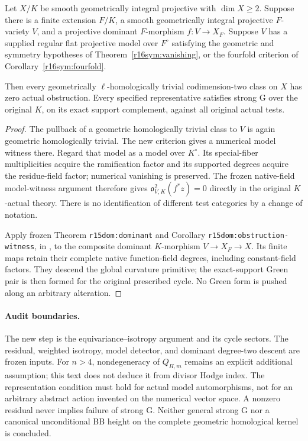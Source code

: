 \begin{corollary}
\label{r16sym:dominant}
Let $X/K$ be smooth geometrically integral projective with $\dim X\geq2$.
Suppose there is a finite extension $F/K$, a smooth geometrically integral
projective $F$-variety $V$, and a projective dominant
$F$-morphism $f:V\to X_F$.  Suppose $V$ has a supplied
regular flat projective model over $F^\circ$ satisfying the
geometric and symmetry hypotheses of
Theorem~\ref{r16sym:vanishing}, or the fourfold criterion
of Corollary~\ref{r16sym:fourfold}.

Then every geometrically $\ell$-homologically trivial
codimension-two class on $X$ has zero actual obstruction.
Every specified representative satisfies strong G over
the original $K$, on its exact support complement, against
all original actual tests.
\end{corollary}

\begin{proof}
The pullback of a geometric homologically trivial class
to $V$ is again geometric homologically trivial.  The new
criterion gives a numerical model witness there.  Regard
that model as a model over $K^\circ$.  Its special-fiber
multiplicities acquire the ramification factor and its
supported degrees acquire the residue-field factor;
numerical vanishing is preserved.  The frozen native-field
model-witness argument therefore gives
$\mathfrak o_{V,K}^2(f^*z)=0$ directly in the original
$K$-actual theory.  There is no identification of different
test categories by a change of notation.

Apply frozen Theorem \texttt{r15dom:dominant} and Corollary
\texttt{r15dom:obstruction-witness}, in
, to the
composite dominant $K$-morphism $V\to X_F\to X$.
Its finite maps retain their complete native function-field
degrees, including constant-field factors.  They descend
the global curvature primitive; the exact-support Green
pair is then formed for the original prescribed cycle.
No Green form is pushed along an arbitrary alteration.
\end{proof}

\paragraph{Audit boundaries.}
The new step is the equivariance--isotropy argument and its
cycle sectors.  The residual, weighted isotropy, model
detector, and dominant degree-two descent are frozen inputs.
For $n>4$, nondegeneracy of $Q_{H,m}$ remains an explicit
additional assumption; this text does not deduce it from
divisor Hodge index.  The representation condition must
hold for actual model automorphisms, not for an arbitrary
abstract action invented on the numerical vector space.
A nonzero residual never implies failure of strong G.
Neither general strong G nor a canonical unconditional
BB height on the complete geometric homological kernel
is concluded.

